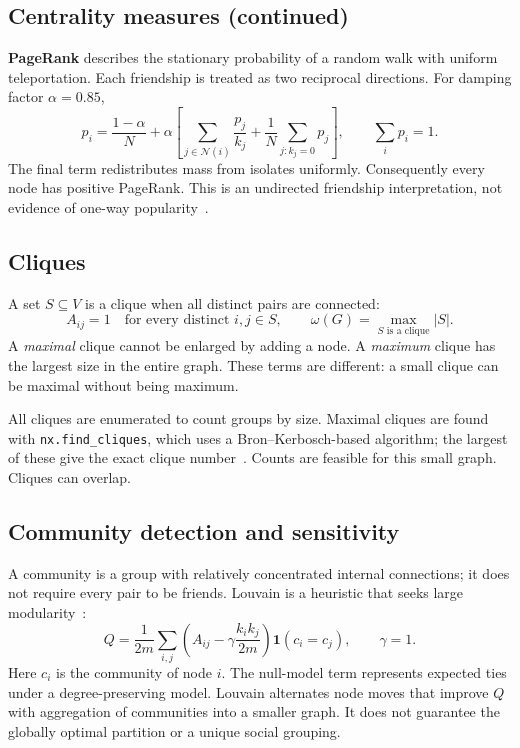 \documentclass[11pt,a4paper]{article}
\begin{document}
\clearpage
\subsection*{Centrality measures (continued)}
\textbf{PageRank} describes the stationary probability of a random walk with
uniform teleportation. Each friendship is treated as two reciprocal directions.
For damping factor $\alpha=0.85$,
\begin{equation}
p_i=\frac{1-\alpha}{N}+\alpha\left[
\sum_{j\in\mathcal{N}(i)}\frac{p_j}{k_j}
+\frac{1}{N}\sum_{j:k_j=0}p_j\right],\qquad \sum_i p_i=1.
\end{equation}
The final term redistributes mass from isolates uniformly. Consequently every
node has positive PageRank. This is an undirected friendship interpretation,
not evidence of one-way popularity~\cite{nxpagerank}.

\subsection{Cliques}
A set $S\subseteq V$ is a clique when all distinct pairs are connected:
\begin{equation}
A_{ij}=1\quad\text{for every distinct }i,j\in S,
\qquad \omega(G)=\max_{S\text{ is a clique}}|S|.
\end{equation}
A \emph{maximal} clique cannot be enlarged by adding a node. A \emph{maximum}
clique has the largest size in the entire graph. These terms are different:
a small clique can be maximal without being maximum.

All cliques are enumerated to count groups by size. Maximal cliques are found
with \texttt{nx.find\_cliques}, which uses a Bron--Kerbosch-based algorithm;
the largest of these give the exact clique number~\cite{nxcliques}.
Counts are feasible for this small graph. Cliques can overlap.

\subsection{Community detection and sensitivity}
A community is a group with relatively concentrated internal connections; it
does not require every pair to be friends. Louvain is a heuristic that seeks
large modularity~\cite{blondel,nxlouvain}:
\begin{equation}
Q=\frac{1}{2m}\sum_{i,j}\left(A_{ij}-\gamma\frac{k_i k_j}{2m}\right)
\mathbf{1}(c_i=c_j),\qquad \gamma=1.
\end{equation}
Here $c_i$ is the community of node $i$. The null-model term represents expected
ties under a degree-preserving model. Louvain alternates node moves that improve
$Q$ with aggregation of communities into a smaller graph. It does not guarantee
the globally optimal partition or a unique social grouping.
\end{document}
